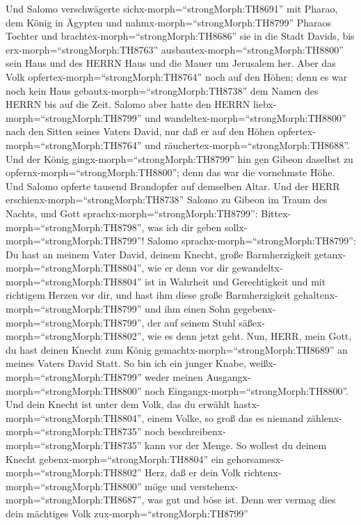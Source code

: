  Und Salomo verschwägerte sichx-morph=``strongMorph:TH8691''
mit Pharao, dem König in Ägypten und nahmx-morph=``strongMorph:TH8799''
Pharaos Tochter und brachtex-morph=``strongMorph:TH8686'' sie in die
Stadt Davids, bis erx-morph=``strongMorph:TH8763''
ausbautex-morph=``strongMorph:TH8800'' sein Haus und des HERRN Haus und
die Mauer um Jerusalem her.  Aber das Volk
opfertex-morph=``strongMorph:TH8764'' noch auf den Höhen; denn es war
noch kein Haus gebautx-morph=``strongMorph:TH8738'' dem Namen des HERRN
bis auf die Zeit.  Salomo aber hatte den HERRN
liebx-morph=``strongMorph:TH8799'' und
wandeltex-morph=``strongMorph:TH8800'' nach den Sitten seines Vaters
David, nur daß er auf den Höhen opfertex-morph=``strongMorph:TH8764''
und räuchertex-morph=``strongMorph:TH8688''.  Und der König
gingx-morph=``strongMorph:TH8799'' hin gen Gibeon daselbst zu
opfernx-morph=``strongMorph:TH8800''; denn das war die vornehmste Höhe.
Und Salomo opferte tausend Brandopfer auf demselben Altar. 
Und der HERR erschienx-morph=``strongMorph:TH8738'' Salomo zu Gibeon im
Traum des Nachts, und Gott sprachx-morph=``strongMorph:TH8799'':
Bittex-morph=``strongMorph:TH8798'', was ich dir geben
sollx-morph=``strongMorph:TH8799''!  Salomo
sprachx-morph=``strongMorph:TH8799'': Du hast an meinem Vater David,
deinem Knecht, große Barmherzigkeit getanx-morph=``strongMorph:TH8804'',
wie er denn vor dir gewandeltx-morph=``strongMorph:TH8804'' ist in
Wahrheit und Gerechtigkeit und mit richtigem Herzen vor dir, und hast
ihm diese große Barmherzigkeit gehaltenx-morph=``strongMorph:TH8799''
und ihm einen Sohn gegebenx-morph=``strongMorph:TH8799'', der auf seinem
Stuhl säßex-morph=``strongMorph:TH8802'', wie es denn jetzt geht.
 Nun, HERR, mein Gott, du hast deinen Knecht zum König
gemachtx-morph=``strongMorph:TH8689'' an meines Vaters David Statt. So
bin ich ein junger Knabe, weißx-morph=``strongMorph:TH8799'' weder
meinen Ausgangx-morph=``strongMorph:TH8800'' noch
Eingangx-morph=``strongMorph:TH8800''.  Und dein Knecht ist
unter dem Volk, das du erwählt hastx-morph=``strongMorph:TH8804'', einem
Volke, so groß das es niemand zählenx-morph=``strongMorph:TH8735'' noch
beschreibenx-morph=``strongMorph:TH8735'' kann vor der Menge.
 So wollest du deinem Knecht
gebenx-morph=``strongMorph:TH8804'' ein
gehorsamesx-morph=``strongMorph:TH8802'' Herz, daß er dein Volk
richtenx-morph=``strongMorph:TH8800'' möge und
verstehenx-morph=``strongMorph:TH8687'', was gut und böse ist. Denn wer
vermag dies dein mächtiges Volk zux-morph=``strongMorph:TH8799''
